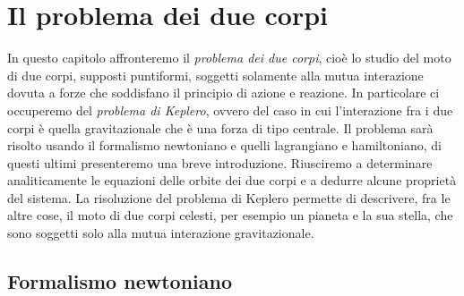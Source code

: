 \chapter{Il problema dei due corpi}
\label{chap:due-corpi}

In questo capitolo affronteremo il \emph{problema dei due corpi}, cioè lo studio
del moto di due corpi, supposti puntiformi, soggetti solamente alla mutua
interazione dovuta a forze che soddisfano il principio di azione e reazione. In
particolare ci occuperemo del \emph{problema di Keplero}, ovvero del caso in cui
l'interazione fra i due corpi è quella gravitazionale che è una forza di tipo
centrale. Il problema sarà risolto usando il formalismo newtoniano e quelli
lagrangiano e hamiltoniano, di questi ultimi presenteremo una breve
introduzione. Riusciremo a determinare analiticamente le equazioni delle orbite
dei due corpi e a dedurre alcune proprietà del sistema. La risoluzione del
problema di Keplero permette di descrivere, fra le altre cose, il moto di due
corpi celesti, per esempio un pianeta e la sua stella, che sono soggetti solo
alla mutua interazione gravitazionale.

\section{Formalismo newtoniano}
\label{sec:formalismo-newton}

